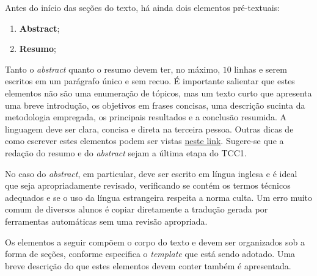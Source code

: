 Antes do início das seções do texto, há ainda dois elementos pré-textuais:

\begin{enumerate}[resume]
  \item \textbf{Abstract};
  \item \textbf{Resumo};
\end{enumerate}

Tanto o \emph{abstract} quanto o resumo devem ter, no máximo, $10$ linhas e serem escritos em um parágrafo único e sem recuo. É importante salientar que estes elementos não são uma enumeração de tópicos, mas um texto curto que apresenta uma breve introdução, os objetivos em frases concisas, uma descrição sucinta da metodologia empregada, os principais resultados e a conclusão resumida. A linguagem deve ser clara, concisa e direta na terceira pessoa. Outras dicas de como escrever estes elementos podem ser vistas \href{https://goo.gl/e4wmhU}{neste link}. Sugere-se que a redação do resumo e do \emph{abstract} sejam a última etapa do TCC1.

No caso do \emph{abstract}, em particular, deve ser escrito em língua inglesa e é ideal que seja apropriadamente revisado, verificando se contém os termos técnicos adequados e se o uso da língua estrangeira respeita a norma culta. Um erro muito comum de diversos alunos é copiar diretamente a tradução gerada por ferramentas automáticas sem uma revisão apropriada.

Os elementos a seguir compõem o corpo do texto e devem ser organizados sob a forma de seções, conforme especifica o \emph{template} que está sendo adotado. Uma breve descrição do que estes elementos devem conter também é apresentada.

